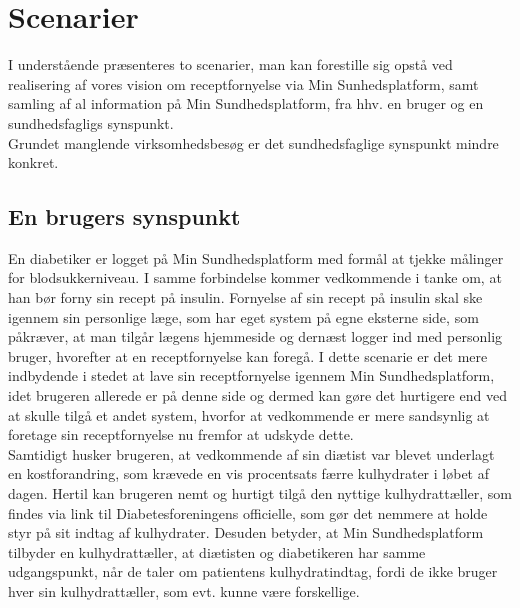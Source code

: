 \section{Scenarier} \label{sec}
I understående præsenteres to scenarier, man kan forestille sig opstå ved realisering af vores vision om receptfornyelse via Min Sunhedsplatform, samt samling af al information 
 på Min Sundhedsplatform, fra hhv. en bruger og en sundhedsfagligs synspunkt. \\
 Grundet manglende virksomhedsbesøg er det sundhedsfaglige synspunkt mindre konkret. 

\subsection{En brugers synspunkt}
En diabetiker er logget på Min Sundhedsplatform med formål at tjekke målinger for blodsukkerniveau. I samme forbindelse kommer vedkommende i tanke om, at han bør forny sin recept på insulin. Fornyelse af sin recept på insulin skal ske igennem sin personlige læge, som har eget system på egne eksterne side, som påkræver, at man tilgår lægens hjemmeside og dernæst logger ind med personlig bruger, hvorefter at en receptfornyelse kan foregå. I dette scenarie er det mere indbydende i stedet at lave sin receptfornyelse igennem Min Sundhedsplatform, idet brugeren allerede er på denne side og dermed kan gøre det hurtigere end ved at skulle tilgå et andet system, hvorfor at vedkommende er mere sandsynlig at foretage sin receptfornyelse nu fremfor at udskyde dette.\\
Samtidigt husker brugeren, at vedkommende af sin diætist var blevet underlagt en kostforandring, som krævede en vis procentsats færre kulhydrater i løbet af dagen. Hertil kan brugeren nemt og hurtigt tilgå den nyttige kulhydrattæller, som findes via link til Diabetesforeningens officielle, som gør det nemmere at holde styr på sit indtag af kulhydrater. Desuden betyder, at Min Sundhedsplatform tilbyder en kulhydrattæller, at diætisten og diabetikeren har samme udgangspunkt, når de taler om patientens kulhydratindtag, fordi de ikke bruger hver sin kulhydrattæller, som evt. kunne være forskellige. 


